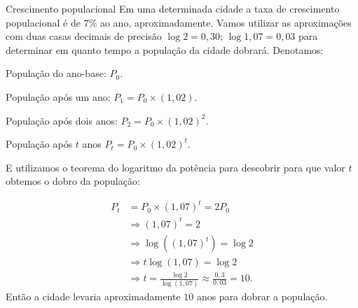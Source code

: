 \begin{example}{Crescimento populacional}
Em uma determinada cidade a taxa de crescimento populacional é de $7\%$ ao ano, aproximadamente. Vamos utilizar as aproximações com duas casas decimais de precisão $\log 2 = 0{,}30$; $\log 1{,}07 =0{,}03$ para determinar em quanto tempo a população da cidade dobrará. Denotamos:

População do ano-base: $P_0$.

População após um ano: $P_1=P_0 \times (1{,}02).$

População após dois anos: $P_2= P_0 \times (1{,}02)^2$.

População após $t$ anos $P_t =  P_0 \times (1{,}02)^t$.

E utilizamos o teorema do logaritmo da potência para descobrir para que valor $t$ obtemos o dobro da população:

\begin{align*}
P_t &= P_0 \times (1{,}07)^t = 2 P_0\\
&\Longrightarrow (1{,}07)^t = 2\\
&\Longrightarrow \log((1{,}07)^t) = \log 2\\
&\Longrightarrow t\log(1{,}07) = \log 2\\
&\Longrightarrow t = \frac{\log 2}{\log(1{,}07)}\approx\frac{0,3}{0,03}=10.
\end{align*}
Então a cidade levaria aproximadamente $10$ anos para dobrar a população.
\end{example}
\clearpage
\def\currentcolor{cor1}
